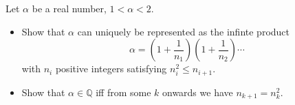 Let \(\alpha\) be a real number, \(1<\alpha<2\).
\begin{itemize}

\item[(a)] Show that \(\alpha\) can uniquely be represented as the infinte product \[ \alpha = \left(1+\dfrac1{n_1}\right)\left(1+\dfrac1{n_2}\right)\cdots \] with \(n_i\) positive integers satisfying \(n_i^2\le n_{i+1}\).

\item[(b)] Show that \(\alpha\in\mathbb{Q}\) iff from some \(k\) onwards we have \(n_{k+1}=n_k^2\).
\end{itemize}
